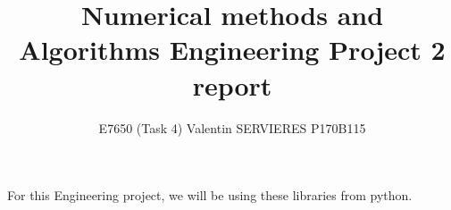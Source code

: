 \documentclass[a4paper,11pt,twoside]{article}
\begin{document}
\dosecttoc{} %
\clearpage

\setcounter{page}{1}
\title{Numerical methods and Algorithms Engineering Project 2 report}
\author{E7650 (Task 4) Valentin SERVIERES P170B115 }
\date{}
\maketitle

For this Engineering project, we will be using these libraries from python.




\end{document}
